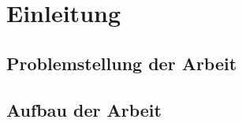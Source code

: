 %
\chapter{Einleitung}
\label{sec:intro}


\section{Problemstellung der Arbeit}


\section{Aufbau der Arbeit}
